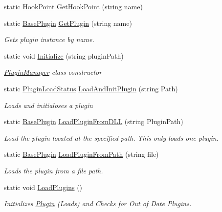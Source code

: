 \begin{DoxyCompactItemize}
static \hyperlink{classOTA_1_1Plugin_1_1HookPoint}{Hook\+Point} \hyperlink{classOTA_1_1PluginManager_a55be5e38710ba54d5ec5af64aa2e47b9}{Get\+Hook\+Point} (string name)
\item 
static \hyperlink{classOTA_1_1Plugin_1_1BasePlugin}{Base\+Plugin} \hyperlink{classOTA_1_1PluginManager_a01989b4ab7e0ae71af29431ff7850a2f}{Get\+Plugin} (string name)
\begin{DoxyCompactList}\small\item\em Gets plugin instance by name. \end{DoxyCompactList}\item 
static void \hyperlink{classOTA_1_1PluginManager_ac59f0de8b4d982ff5060819fc081291e}{Initialize} (string plugin\+Path)
\begin{DoxyCompactList}\small\item\em \hyperlink{classOTA_1_1PluginManager}{Plugin\+Manager} class constructor \end{DoxyCompactList}\item 
static \hyperlink{namespaceOTA_a6a85498d6b4013ed2e9221168ed1d999}{Plugin\+Load\+Status} \hyperlink{classOTA_1_1PluginManager_a3d382380ed135df5bdd0f82cbde6a0fd}{Load\+And\+Init\+Plugin} (string Path)
\begin{DoxyCompactList}\small\item\em Loads and initialoses a plugin \end{DoxyCompactList}\item 
static \hyperlink{classOTA_1_1Plugin_1_1BasePlugin}{Base\+Plugin} \hyperlink{classOTA_1_1PluginManager_abf01ebb1fe63d1728a6d712461ce8d54}{Load\+Plugin\+From\+D\+L\+L} (string Plugin\+Path)
\begin{DoxyCompactList}\small\item\em Load the plugin located at the specified path. This only loads one plugin. \end{DoxyCompactList}\item 
static \hyperlink{classOTA_1_1Plugin_1_1BasePlugin}{Base\+Plugin} \hyperlink{classOTA_1_1PluginManager_a50d4880df97a1ae201876ca993706547}{Load\+Plugin\+From\+Path} (string file)
\begin{DoxyCompactList}\small\item\em Loads the plugin from a file path. \end{DoxyCompactList}\item 
static void \hyperlink{classOTA_1_1PluginManager_aa3801d10253437b0535bb9ccc08497ae}{Load\+Plugins} ()
\begin{DoxyCompactList}\small\item\em Initializes \hyperlink{namespaceOTA_1_1Plugin}{Plugin} (Loads) and Checks for Out of Date Plugins. \end{DoxyCompactList}\item 

\end{DoxyCompactItemize}
